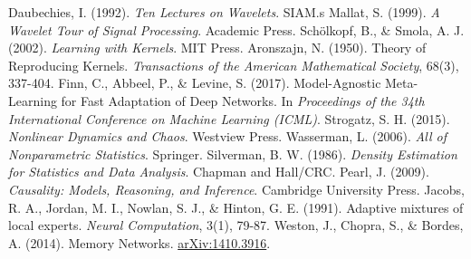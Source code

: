 \documentclass{article}
\begin{document}
\begin{thebibliography}{99}
 Daubechies, I. (1992). \textit{Ten Lectures on Wavelets}. SIAM.s
 Mallat, S. (1999). \textit{A Wavelet Tour of Signal Processing}. Academic Press.
 Schölkopf, B., \& Smola, A. J. (2002). \textit{Learning with Kernels}. MIT Press.
 Aronszajn, N. (1950). Theory of Reproducing Kernels. \textit{Transactions of the American Mathematical Society}, 68(3), 337-404.
 Finn, C., Abbeel, P., \& Levine, S. (2017). Model-Agnostic Meta-Learning for Fast Adaptation of Deep Networks. In \textit{Proceedings of the 34th International Conference on Machine Learning (ICML)}.
 Strogatz, S. H. (2015). \textit{Nonlinear Dynamics and Chaos}. Westview Press.
 Wasserman, L. (2006). \textit{All of Nonparametric Statistics}. Springer.
 Silverman, B. W. (1986). \textit{Density Estimation for Statistics and Data Analysis}. Chapman and Hall/CRC.
 Pearl, J. (2009). \textit{Causality: Models, Reasoning, and Inference}. Cambridge University Press.
 Jacobs, R. A., Jordan, M. I., Nowlan, S. J., \& Hinton, G. E. (1991). Adaptive mixtures of local experts. \textit{Neural Computation}, 3(1), 79-87.
 Weston, J., Chopra, S., \& Bordes, A. (2014). Memory Networks. \href{https://arxiv.org/abs/1410.3916}{arXiv:1410.3916}.

\end{thebibliography}
\end{document}
